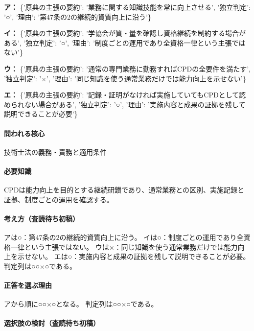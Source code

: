 \noindent\textbf{ア：} \{'原典の主張の要約': '業務に関する知識技能を常に向上させる', '独立判定': '○', '理由': '第47条の2の継続的資質向上に沿う'\}\par

\noindent\textbf{イ：} \{'原典の主張の要約': '学協会が質・量を確認し資格継続を制約する場合がある', '独立判定': '○', '理由': '制度ごとの運用であり全資格一律という主張ではない'\}\par

\noindent\textbf{ウ：} \{'原典の主張の要約': '通常の専門業務に勤務すればCPDの全要件を満たす', '独立判定': '×', '理由': '同じ知識を使う通常業務だけでは能力向上を示せない'\}\par

\noindent\textbf{エ：} \{'原典の主張の要約': '記録・証明がなければ実施していてもCPDとして認められない場合がある', '独立判定': '○', '理由': '実施内容と成果の証拠を残して説明できることが必要'\}\par

\paragraph{問われる核心} 技術士法の義務・責務と適用条件

\paragraph{必要知識} CPDは能力向上を目的とする継続研鑚であり、通常業務との区別、実施記録と証拠、制度ごとの運用を確認する。

\paragraph{考え方（査読待ち初稿）} アは○：第47条の2の継続的資質向上に沿う。 イは○：制度ごとの運用であり全資格一律という主張ではない。 ウは×：同じ知識を使う通常業務だけでは能力向上を示せない。 エは○：実施内容と成果の証拠を残して説明できることが必要。 判定列は○○×○である。

\paragraph{正答を選ぶ理由} アから順に○○×○となる。  判定列は○○×○である。

\paragraph{選択肢の検討（査読待ち初稿）}\mbox{}\par

